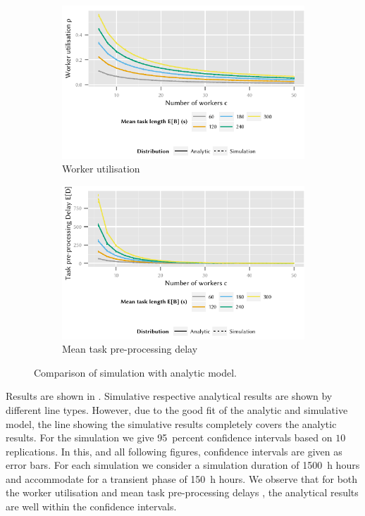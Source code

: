 \begin{figure}
	\centering
	\begin{subfigure}{\columnwidth}
		\includegraphics{cloud/crowdsourcing/model/figures/comparison_utilization}
		\caption{Worker utilisation \workerUtilization}
		\label{fig:cloud:crowdsourcing:validation:model:utilization}
	\end{subfigure}

	\begin{subfigure}{\columnwidth}
		\includegraphics{cloud/crowdsourcing/model/figures/comparison_task_delay}
		\caption{Mean task pre-processing delay \preTaskProcessingDelay}
		\label{fig:cloud:crowdsourcing:validation:model:task_delay}
	\end{subfigure}
	\caption{Comparison of simulation with analytic model.}
	\label{fig:cloud:crowdsourcing:validation:model}
\end{figure}

Results are shown in .
Simulative respective analytical results are shown by different line types.
However, due to the good fit of the analytic and simulative model, the line showing the simulative results completely covers the analytic results.
For the simulation we give \SI{95}{percent} confidence intervals based on \(10\) replications.
In this, and all following figures, confidence intervals are given as error bars.
For each simulation we consider a simulation duration of \SI{1500}{\hour} hours and accommodate for a transient phase of \SI{150}{\hour} hours.
We observe that for both the worker utilisation \workerUtilization and mean task pre-processing delays \preTaskProcessingDelay, the analytical results are well within the confidence intervals.